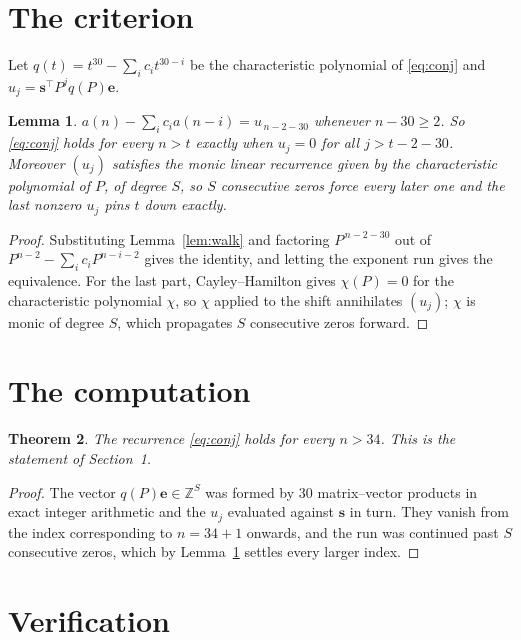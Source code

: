 \documentclass[11pt,a4paper]{article}
\theoremstyle{plain}
\newtheorem{theorem}{Theorem}
\newtheorem{lemma}[theorem]{Lemma}
\theoremstyle{definition}
\begin{document}
\section{The criterion}

Let $q(t)=t^{30}-\sum_i c_i t^{30-i}$ be the characteristic polynomial of
\eqref{eq:conj} and $u_j=\mathbf{s}^{\!\top}P^{j}q(P)\mathbf{e}$.

\begin{lemma}\label{lem:crit}
$a(n)-\sum_i c_i a(n-i)=u_{\,n-2-30}$ whenever $n-30\ge2$. So \eqref{eq:conj}
holds for every $n>t$ exactly when $u_j=0$ for all $j>t-2-30$. Moreover $(u_j)$
satisfies the monic linear recurrence given by the characteristic polynomial of $P$, of
degree $S$, so $S$ consecutive zeros force every later one and the last nonzero $u_j$ pins
$t$ down exactly.
\end{lemma}

\begin{proof}
Substituting Lemma~\ref{lem:walk} and factoring $P^{\,n-2-30}$ out of
$P^{n-2}-\sum_i c_i P^{n-i-2}$ gives the identity, and letting the exponent run gives the
equivalence. For the last part, Cayley--Hamilton gives $\chi(P)=0$ for the characteristic
polynomial $\chi$, so $\chi$ applied to the shift annihilates $(u_j)$; $\chi$ is monic of
degree $S$, which propagates $S$ consecutive zeros forward.
\end{proof}

\section{The computation}

\begin{theorem}
The recurrence \eqref{eq:conj} holds for every $n>34$. This is the statement of
Section~1.
\end{theorem}

\begin{proof}
The vector $q(P)\mathbf{e}\in\mathbb{Z}^{S}$ was formed by $30$ matrix--vector
products in exact integer arithmetic and the $u_j$ evaluated against $\mathbf{s}$ in turn.
They vanish from the index corresponding to $n=34+1$ onwards, and the run was continued
past $S$ consecutive zeros, which by Lemma~\ref{lem:crit} settles every larger index.
\end{proof}

\section{Verification}
\end{document}
